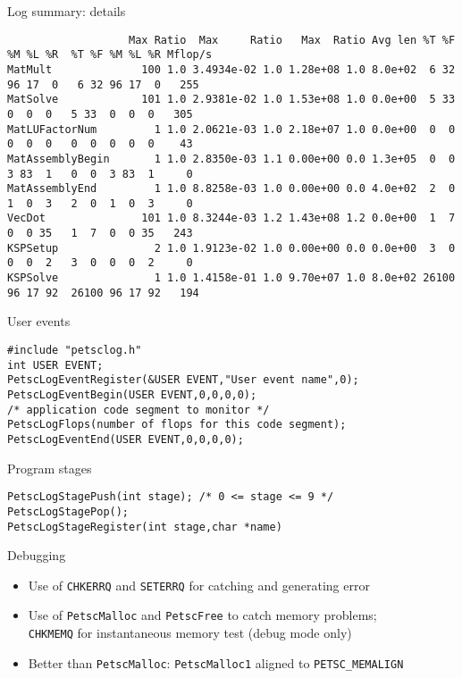 \begin{numberedframe}{Log summary: details}
\tiny
\begin{verbatim}
                   Max Ratio  Max     Ratio   Max  Ratio Avg len %T %F %M %L %R  %T %F %M %L %R Mflop/s
MatMult              100 1.0 3.4934e-02 1.0 1.28e+08 1.0 8.0e+02  6 32 96 17  0   6 32 96 17  0   255
MatSolve             101 1.0 2.9381e-02 1.0 1.53e+08 1.0 0.0e+00  5 33  0  0  0   5 33  0  0  0   305
MatLUFactorNum         1 1.0 2.0621e-03 1.0 2.18e+07 1.0 0.0e+00  0  0  0  0  0   0  0  0  0  0    43
MatAssemblyBegin       1 1.0 2.8350e-03 1.1 0.00e+00 0.0 1.3e+05  0  0  3 83  1   0  0  3 83  1     0
MatAssemblyEnd         1 1.0 8.8258e-03 1.0 0.00e+00 0.0 4.0e+02  2  0  1  0  3   2  0  1  0  3     0
VecDot               101 1.0 8.3244e-03 1.2 1.43e+08 1.2 0.0e+00  1  7  0  0 35   1  7  0  0 35   243
KSPSetup               2 1.0 1.9123e-02 1.0 0.00e+00 0.0 0.0e+00  3  0  0  0  2   3  0  0  0  2     0
KSPSolve               1 1.0 1.4158e-01 1.0 9.70e+07 1.0 8.0e+02 26100 96 17 92  26100 96 17 92   194
\end{verbatim}
\end{numberedframe}

\begin{longversion}
\begin{numberedframe}{User events}
\begin{lstlisting}
#include "petsclog.h"
int USER EVENT;
PetscLogEventRegister(&USER EVENT,"User event name",0);
PetscLogEventBegin(USER EVENT,0,0,0,0);
/* application code segment to monitor */
PetscLogFlops(number of flops for this code segment);
PetscLogEventEnd(USER EVENT,0,0,0,0);
\end{lstlisting}
\end{numberedframe}

\begin{numberedframe}{Program stages}
\begin{lstlisting}
PetscLogStagePush(int stage); /* 0 <= stage <= 9 */
PetscLogStagePop();
PetscLogStageRegister(int stage,char *name)
\end{lstlisting}
\end{numberedframe}
\end{longversion}

\begin{numberedframe}{Debugging}
  \begin{itemize}
  \item Use of \lstinline{CHKERRQ} and \lstinline{SETERRQ} for catching and generating
    error
  \item Use of \lstinline{PetscMalloc} and \lstinline{PetscFree} to catch memory problems;\\
    \lstinline{CHKMEMQ} for instantaneous memory test (debug mode only)
  \item Better than \lstinline{PetscMalloc}:
    \lstinline{PetscMalloc1} aligned to \lstinline{PETSC_MEMALIGN}
  \end{itemize}
\end{numberedframe}




